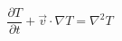 \documentclass[preview]{standalone}
\begin{document}
\setcounter{equation}{3}
\begin{equation}
    \frac{\partial T}{\partial t} + \vec{v} \cdot \nabla T = \nabla^2 T
\end{equation}
\end{document}
